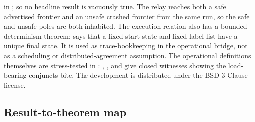 \documentclass[11pt,a4paper]{article}
\begin{document}
in ;
so no headline result is vacuously true. The relay reaches both a safe advertised
frontier and an unsafe crashed frontier from the same run, so the safe and unsafe
poles are both inhabited.
The execution relation also has a bounded determinism theorem:
says that a fixed start state and fixed label list have a unique final state.
It is used as trace-bookkeeping in the operational bridge, not as a scheduling
or distributed-agreement assumption.
The operational definitions themselves are stress-tested in
:
,
,
and
give closed witnesses showing the load-bearing conjuncts bite.
The development is distributed under the BSD 3-Clause license.

\subsection*{Result-to-theorem map}
\end{document}
